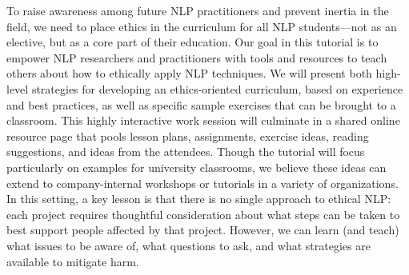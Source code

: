 To raise awareness among future NLP practitioners and prevent inertia in the field, we need to place ethics in the curriculum for all NLP students---not as an elective, but as a core part of their education. Our goal in this tutorial is to empower NLP researchers and practitioners with tools and resources to teach others about how to ethically apply NLP techniques. We will present both high-level strategies for developing an ethics-oriented curriculum, based on experience and best practices, as well as specific sample exercises that can be brought to a classroom. This highly interactive work session will culminate in a shared online resource page that pools lesson plans, assignments, exercise ideas, reading suggestions, and ideas from the attendees. Though the tutorial will focus particularly on examples for university classrooms, we believe these ideas can extend to company-internal workshops or tutorials in a variety of organizations. In this setting, a key lesson is that there is no single approach to ethical NLP: each project requires thoughtful consideration about what steps can be taken to best support people affected by that project. However, we can learn (and teach) what issues to be aware of, what questions to ask, and what strategies are available to mitigate harm.
